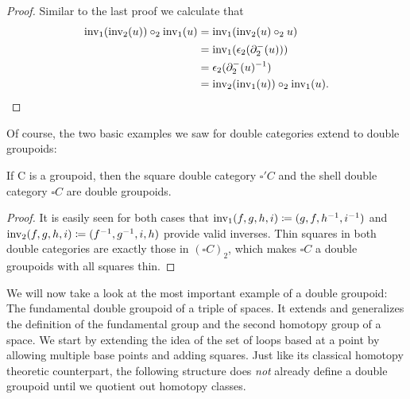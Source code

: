 \begin{proof}
Similar to the last proof we calculate that
\begin{align*}
\operatorname{inv_1}(\operatorname{inv_2}(u)) \circ_2 \operatorname{inv_1}(u)
	&= \operatorname{inv_1}(\operatorname{inv_2}(u) \circ_2 u) \\
	&= \operatorname{inv_1}(\epsilon_2(\partial^-_2(u))) \\
	&= \epsilon_2(\partial^-_2(u)^{-1}) \\
	&= \operatorname{inv_2}(\operatorname{inv_1}(u)) \circ_2 \operatorname{inv_1}(u) \text{.}
\end{align*}
\end{proof}

Of course, the two basic examples we saw for double categories extend to
double groupoids:
\begin{lemma} \label{thm:shell-dbl-gpd}
If C is a groupoid, then the square double category $\square' C$ and the
shell double category $\square C$ are double groupoids.
\end{lemma}

\begin{proof}
It is easily seen for both cases that $\operatorname{inv_1}(f, g, h, i) \coloneqq (g, f, h^{-1}, i^{-1})$
and $\operatorname{inv_2}(f, g, h, i) \coloneqq (f^{-1}, g^{-1}, i, h)$ provide valid inverses.
Thin squares in both double categories are exactly those in $(\square C)_2$,
which makes $\square C$ a double groupoids with all squares thin. %
\end{proof}

We will now take a look at the most important example of a double groupoid:
The fundamental double groupoid of a triple of spaces. 
It extends and generalizes the definition of the fundamental group and the second
homotopy group of a space.
We start by extending the idea of the set of loops based at a point by allowing
multiple base points and adding squares.
Just like its classical homotopy theoretic counterpart,
the following structure does \emph{not} already define a double groupoid until we
quotient out homotopy classes.

